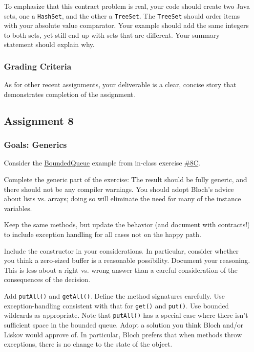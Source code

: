 \documentclass[11pt]{article}
\begin{document}
To emphasize that this contract problem is real, your code should create two Java sets, one a \texttt{HashSet}, and the other a \texttt{TreeSet}. The \texttt{TreeSet} should order items with your absolute value comparator. Your example should add the same integers to both sets, yet still end up with sets that are different. Your summary statement should explain why.

\subsubsection{Grading Criteria}
\label{sec:orgd75a7c5}
As for other recent assignments, your deliverable is a clear, concise story that demonstrates completion of the assignment.


\subsection{Assignment 8}
\label{sec:org3b589ce}
\subsubsection{Goals: Generics}
\label{sec:org3b1afb4}

Consider the \href{./files/BoundedQueue.java}{BoundedQueue} example from in-class exercise \href{./inclass08C.html}{\#8C}.

Complete the generic part of the exercise: The result should be fully generic, and there should not be any compiler warnings. You should adopt Bloch's advice about lists vs. arrays; doing so will eliminate the need for many of the instance variables.

Keep the same methods, but update the behavior (and document with contracts!) to include exception handling for all cases not on the happy path.

Include the constructor in your considerations. In particular, consider whether you think a zero-sized buffer is a reasonable possibility. Document your reasoning. This is less about a right vs. wrong answer than a careful consideration of the consequences of the decision.

Add \texttt{putAll()} and \texttt{getAll()}. Define the method signatures carefully. Use exception-handling consistent with that for \texttt{get()} and \texttt{put()}. Use bounded wildcards as appropriate. Note that \texttt{putAll()} has a special case where there isn't sufficient space in the bounded queue. Adopt a solution you think Bloch and/or Liskov would approve of. In particular, Bloch prefers that when methods throw exceptions, there is no change to the state of the object.
\end{document}
